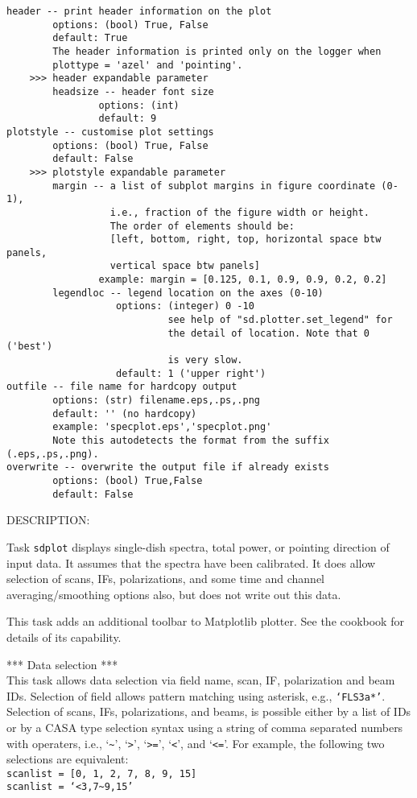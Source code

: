 \begin{verbatim}
header -- print header information on the plot
        options: (bool) True, False
        default: True
        The header information is printed only on the logger when 
        plottype = 'azel' and 'pointing'. 
    >>> header expandable parameter
        headsize -- header font size
                options: (int)
                default: 9
plotstyle -- customise plot settings
        options: (bool) True, False
        default: False
    >>> plotstyle expandable parameter
        margin -- a list of subplot margins in figure coordinate (0-1), 
                  i.e., fraction of the figure width or height.
                  The order of elements should be:
                  [left, bottom, right, top, horizontal space btw panels,
                  vertical space btw panels]
                example: margin = [0.125, 0.1, 0.9, 0.9, 0.2, 0.2]
        legendloc -- legend location on the axes (0-10)
                   options: (integer) 0 -10 
                            see help of "sd.plotter.set_legend" for 
                            the detail of location. Note that 0 ('best')
                            is very slow. 
                   default: 1 ('upper right')
outfile -- file name for hardcopy output
        options: (str) filename.eps,.ps,.png
        default: '' (no hardcopy)
        example: 'specplot.eps','specplot.png'
        Note this autodetects the format from the suffix (.eps,.ps,.png).
overwrite -- overwrite the output file if already exists
        options: (bool) True,False
        default: False
\end{verbatim}

DESCRIPTION:
    
Task {\tt sdplot} displays single-dish spectra, total power,
or pointing direction of input data.
It assumes that the spectra have been calibrated.
It does allow selection of scans, IFs, polarizations, and
some time and channel averaging/smoothing options also,
but does not write out this data.

This task adds an additional toolbar to Matplotlib plotter. 
See the cookbook for details of its capability.

*** Data selection ***\\
This task allows data selection via field name, scan, IF,
polarization and beam IDs. Selection of field allows pattern
matching using asterisk, e.g., {\tt `FLS3a*'}. Selection of scans,
IFs, polarizations, and beams, is possible either by a list
of IDs or by a CASA type selection syntax using a string of 
comma separated numbers with operaters, i.e., `{\tt \~{}}', `{\tt >}', `{\tt >=}',
`{\tt <}', and `{\tt <=}'.
For example, the following two selections are equivalent:\\
{\tt scanlist = [0, 1, 2, 7, 8, 9, 15]}\\
{\tt scanlist = `<3,7\~{}9,15'}

